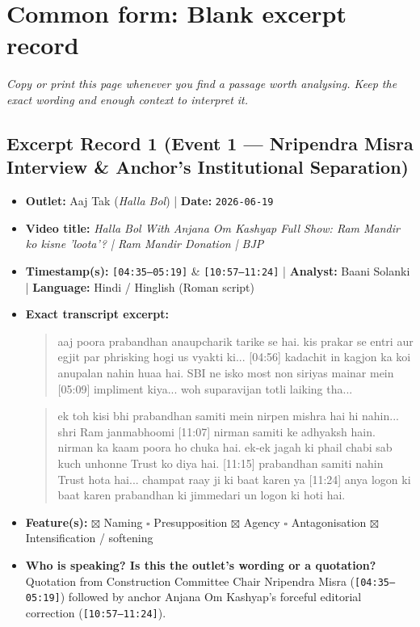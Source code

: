 \documentclass[10pt,a4paper]{article}
\begin{document}
\section*{Common form: Blank excerpt record}
\textit{Copy or print this page whenever you find a passage worth analysing. Keep the exact wording and enough context to interpret it.}


\subsection*{Excerpt Record 1 (Event 1 --- Nripendra Misra Interview \& Anchor's Institutional Separation)}
\begin{itemize}[leftmargin=1.5em, itemsep=3pt, topsep=4pt]
  \item \textbf{Outlet:} Aaj Tak (\textit{Halla Bol}) | \textbf{Date:} \texttt{2026-06-19}
  \item \textbf{Video title:} \textit{Halla Bol With Anjana Om Kashyap Full Show: Ram Mandir ko kisne 'loota'? | Ram Mandir Donation | BJP}
  \item \textbf{Timestamp(s):} \texttt{[04:35--05:19]} \& \texttt{[10:57--11:24]} | \textbf{Analyst:} Baani Solanki | \textbf{Language:} Hindi / Hinglish (Roman script)
  \item \textbf{Exact transcript excerpt:}
    \begin{quote}\small{} aaj poora prabandhan anaupcharik tarike se hai. kis prakar se entri aur egjit par phrisking hogi us vyakti ki... [04:56] kadachit in kagjon ka koi anupalan nahin huaa hai. SBI ne isko most non siriyas mainar mein [05:09] impliment kiya... woh suparavijan totli laiking tha...\end{quote}
    \begin{quote}\small{} ek toh kisi bhi prabandhan samiti mein nirpen mishra hai hi nahin... shri Ram janmabhoomi [11:07] nirman samiti ke adhyaksh hain. nirman ka kaam poora ho chuka hai. ek-ek jagah ki phail chabi sab kuch unhonne Trust ko diya hai. [11:15] prabandhan samiti nahin Trust hota hai... champat raay ji ki baat karen ya [11:24] anya logon ki baat karen prabandhan ki jimmedari un logon ki hoti hai.\end{quote}
  \item \textbf{Feature(s):} $\boxtimes$ Naming $\square$ Presupposition $\boxtimes$ Agency $\square$ Antagonisation $\boxtimes$ Intensification / softening
  \item \textbf{Who is speaking? Is this the outlet's wording or a quotation?} Quotation from Construction Committee Chair Nripendra Misra (\texttt{[04:35--05:19]}) followed by anchor Anjana Om Kashyap's forceful editorial correction (\texttt{[10:57--11:24]}).

\end{itemize}
\end{document}
